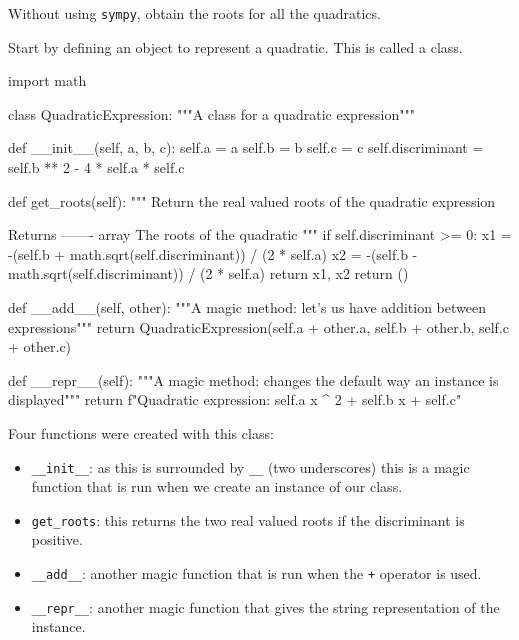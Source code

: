Without using \texttt{sympy}, obtain the roots for all the quadratics.

Start by defining an object to represent a quadratic. This is called a
class.


\begin{pyin}
import math


class QuadraticExpression:
    """A class for a quadratic expression"""

    def __init__(self, a, b, c):
        self.a = a
        self.b = b
        self.c = c
        self.discriminant = self.b ** 2 - 4 * self.a * self.c

    def get_roots(self):
        """
        Return the real valued roots of the quadratic expression

        Returns
        -------
        array
            The roots of the quadratic
        """
        if self.discriminant >= 0:
            x1 = -(self.b + math.sqrt(self.discriminant)) / (2 * self.a)
            x2 = -(self.b - math.sqrt(self.discriminant)) / (2 * self.a)
            return x1, x2
        return ()

    def __add__(self, other):
        """A magic method: let's us have addition between expressions"""
        return QuadraticExpression(self.a + other.a, self.b + other.b, self.c + other.c)

    def __repr__(self):
        """A magic method: changes the default way an instance is displayed"""
        return f"Quadratic expression: {self.a} x ^ 2 + {self.b} x + {self.c}"
\end{pyin}

\begin{note}
Four functions were created with this class:
\begin{itemize}
\item 

\texttt{\_\_init\_\_}: as this is surrounded by \texttt{\_\_} (two underscores) this is a magic
function that is run when we create an instance of our class.

\item 

\texttt{get\_roots}: this returns the two real valued roots if the discriminant is
positive.

\item 

\texttt{\_\_add\_\_}: another magic function that is run when the \texttt{+} operator is used.

\item 

\texttt{\_\_repr\_\_}: another magic function that gives the string representation of the
instance.

\end{itemize}
\end{note}



